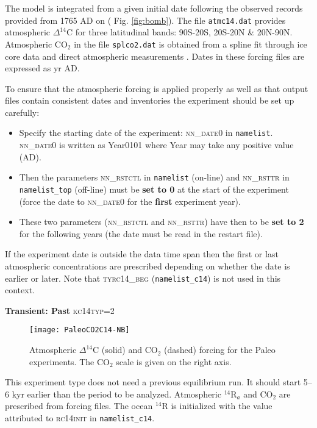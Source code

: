 \documentclass[../main/TOP_manual]{subfiles}
\newcommand{\cd}{\mathrm{CO_2}}
\newcommand{\Dcq}{\Delta ^{14}\mathrm{C}}
\newcommand{\Rq}{\mathrm{^{14}{R}}}
\newcommand{\CODE}[1]{\textsc{#1}}
\begin{document}
The model  is integrated from a given initial date following the observed records provided from 1765 AD on ( Fig. \ref{fig:bomb}).
The file \texttt{atmc14.dat}  \cite[][\& I. Levin, personal comm.]{enting_1994} provides atmospheric $\Dcq$ for three latitudinal bands: 90S-20S,    20S-20N \&    20N-90N.
Atmospheric $\cd$ in the file \texttt{splco2.dat} is obtained from a spline fit through ice core data and direct atmospheric measurements \cite[][\& J. Orr, personal comm.]{orr_2000}.
Dates in these forcing files are expressed as yr AD.

To ensure that the atmospheric forcing is applied properly as well as that output files contain consistent dates and inventories the experiment should be set up carefully:
\begin{itemize}
\item Specify the starting date of the experiment: \CODE{nn\_date0} in \texttt{namelist}.  \CODE{nn\_date0} is written as Year0101 where Year may take any positive value (AD).
\item Then the parameters \CODE{nn\_rstctl} in  \texttt{namelist} (on-line) and \CODE{nn\_rsttr} in \texttt{namelist\_top} (off-line)  must be \textbf{set to 0} at the start of the experiment (force the date to \CODE{nn\_date0} for the \textbf{first} experiment year).
\item These two parameters (\CODE{nn\_rstctl} and \CODE{nn\_rsttr}) have then to be \textbf{set to 2} for the following years (the date must be read in the restart file).
\end{itemize}
 If the experiment date is outside the data time span then the first or last atmospheric concentrations are prescribed depending on whether the date is earlier or later. Note that \CODE{tyrc14\_beg} (\texttt{namelist\_c14}) is not used in this context.

%
\textbf{Transient: Past}
\CODE{kc14typ}=2
%
\begin{figure}[!h]
\begin{center}
\texttt{[image: PaleoCO2C14-NB]}
\end{center}
\vspace{-4ex}
\caption{Atmospheric $\Dcq$ (solid) and $\cd$ (dashed)  forcing for the Paleo experiments. The $\cd$ scale is given on the right axis.} \label{fig:paleo}
\end{figure}

This experiment type does not need a previous equilibrium run. It should start 5--6 kyr earlier than the period to be analyzed.
Atmospheric $\Rq_a$ and $\cd$ are prescribed from forcing files. The ocean $\Rq$ is initialized with the value attributed to \CODE{rc14init} in \texttt{namelist\_c14}.
\end{document}
